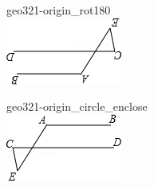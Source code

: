 \documentclass[12pt]{article}
\begin{document}
\begin{center}
\begin{minipage}{0.32\textwidth}
\end{minipage}
\par\medskip
\begin{minipage}{0.32\textwidth}\centering
geo321-origin\_rot180\\
\includegraphics[width=0.95\linewidth]{out_rommath_origin/items/geo321-origin/assets/figure_rot180.png}
\end{minipage}
\hfill\begin{minipage}{0.32\textwidth}\centering
geo321-origin\_circle\_enclose\\
\includegraphics[width=0.95\linewidth]{out_rommath_origin/items/geo321-origin/assets/figure_circle.png}
\end{minipage}
\par
\end{center}
\bigskip
\end{document}
